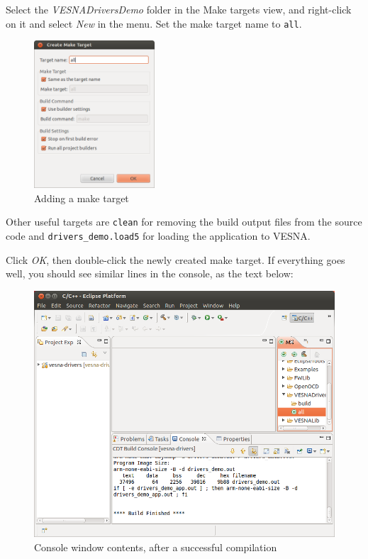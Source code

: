 \documentclass[a4paper, 10pt]{article}
\begin{document}
Select the \emph{VESNADriversDemo} folder in the Make targets view,
and right-click on it and select \emph{New} in the menu.
Set the make target name to \verb+all+.

    \begin{figure}[H]
    \centering
        \includegraphics[width=0.4\textwidth]{./install-guide-linux-images/compile-add-target.png}
        \caption{Adding a make target}
        \label{fig:compile-add-target}
    \end{figure}

Other useful targets are \verb+clean+ for removing the build output files from the source 
code and \verb+drivers_demo.load5+ for loading the application to VESNA.

Click \emph{OK}, then double-click the newly created make target.
If everything goes well, you should see similar lines in the console, as the text below:

    \begin{figure}[H]
    \centering
        \includegraphics[width=\textwidth]{./install-guide-linux-images/compile-result.png}
        \caption{Console window contents, after a successful compilation}
        \label{fig:compile-result}
    \end{figure}
\end{document}
